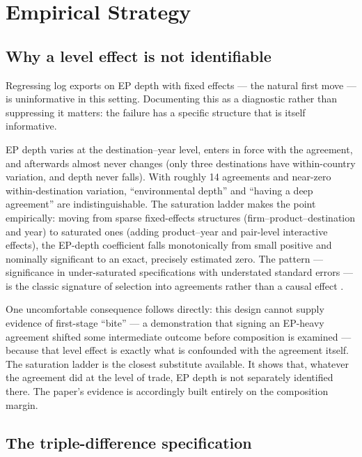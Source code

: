 \documentclass[12pt]{article}
\begin{document}
\section{Empirical Strategy}\label{sec:strategy}

\subsection{Why a level effect is not identifiable}

Regressing log exports on EP depth with fixed effects --- the natural first move ---
is uninformative in this setting. Documenting this as a diagnostic rather than suppressing
it matters: the failure has a specific structure that is itself informative.

EP depth varies at the destination--year level, enters in force with the agreement, and
afterwards almost never changes (only three destinations have within-country variation,
and depth never falls). With roughly 14 agreements and near-zero within-destination
variation, ``environmental depth'' and ``having a deep agreement'' are indistinguishable.
The saturation ladder makes the point empirically: moving from sparse fixed-effects
structures (firm--product--destination and year) to saturated ones (adding
product--year and pair-level interactive effects), the EP-depth coefficient falls
monotonically from small positive and nominally significant to an exact, precisely
estimated zero. The pattern --- significance in under-saturated specifications with
understated standard errors --- is the classic signature of selection into agreements
rather than a causal effect \citep{bertrand2004, goodmanbacon2021}.

One uncomfortable consequence follows directly: this design cannot supply evidence of
first-stage ``bite'' --- a demonstration that signing an EP-heavy agreement shifted some
intermediate outcome before composition is examined --- because that level effect is
exactly what is confounded with the agreement itself. The saturation ladder is the closest
substitute available. It shows that, whatever the agreement did at the level of trade, EP
depth is not separately identified there. The paper's evidence is accordingly built
entirely on the composition margin.

\subsection{The triple-difference specification}
\end{document}
